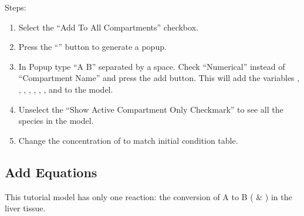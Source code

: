 \documentclass[letterpaper,10pt,english]{sphinxmanual}
\begin{document}
\sphinxAtStartPar
Steps:
\begin{enumerate}
%
\item {} 
\sphinxAtStartPar
Select the “Add To All Compartments” checkbox.

\begin{figure}[htbp]
\centering

\noindent{}
\end{figure}

\item {} 
\sphinxAtStartPar
Press the “\sphinxstylestrong{+}” button to generate a popup.

\item {} 
\sphinxAtStartPar
In Popup type “A B” separated by a space. Check “Numerical” instead of
“Compartment Name” and press the add button. This will add the variables
, , , , , , , and 
to the model.

\begin{figure}[htbp]
\centering

\noindent{}
\end{figure}

\item {} 
\sphinxAtStartPar
Unselect the “Show Active Compartment Only Checkmark” to see all the species
in the model.

\begin{figure}[htbp]
\centering

\noindent{}
\end{figure}

\item {} 
\sphinxAtStartPar
Change the concentration of  to match initial condition table.

\begin{figure}[htbp]
\centering

\noindent{}
\end{figure}

\end{enumerate}


\subsection{Add Equations}
\label{\detokenize{pages/tutorial_mc/addEquations:add-equations}}\label{\detokenize{pages/tutorial_mc/addEquations::doc}}
\sphinxAtStartPar
This tutorial model has only one reaction: the conversion of A to B ( \&
) in the liver tissue.
\end{document}
